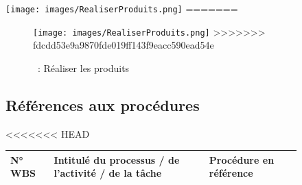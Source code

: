 \newpage
\begin{figure}[H]
\centering
 \texttt{[image: images/RealiserProduits.png]}
=======
\newpage
\begin{figure}[H]
\centering
 \texttt{[image: images/RealiserProduits.png]}
>>>>>>> fdcdd53e9a9870fde019ff143f9eacc590ead54e
 \caption{\WBSCourt{}~: Réaliser les produits}
\label{WBS5}
\end{figure}
\newpage

\newpage
\begin{landscape}
\subsection{Références aux procédures}
<<<<<<< HEAD
\begin{longtable}{|p{3.0cm}|p{14.5cm}|p{5cm}|}
	\hline
	\rowcolor[gray]{0.65}\textbf{N° WBS} & \textbf{Intitulé du processus / de l'activité / de la tâche} & \textbf{Procédure en référence}\\
	\hline
	\endhead %



\end{longtable}
\end{landscape}
\end{figure}
